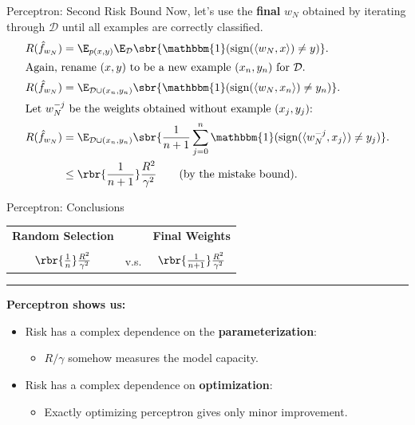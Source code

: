 \documentclass[notheorems]{beamer}
\begin{document}
    \begin{frame}{Perceptron: Second Risk Bound}
        Now, let's use the \textbf{final} $w_{N}$ obtained by iterating through $\mathcal{D}$ until all examples are correctly classified.
        \begin{align*}
        R(\hat f_{w_N}) &= \E_{p(x,y)} \E_\mathcal{D} \sbr{ \mathbbm{1}(\text{sign}(\langle w_N, x\rangle) \neq y)}.\\
        \intertext{Again, rename $(x,y)$ to be a new example $(x_{n}, y_{n})$ for $\mathcal{D}$. }
        R(\hat f_{w_N}) &= \E_{\mathcal{D} \cup (x_{n}, y_{n}) } \sbr{ \mathbbm{1}(\text{sign}(\langle w_N, x_n\rangle) \neq y_n)}.\\
        \intertext{Let $w^{-j}_{N}$ be the weights obtained without example $(x_j, y_j)$:}
        R(\hat f_{w_N}) &= \E_{\mathcal{D} \cup (x_{n}, y_{n}) } \sbr{ \frac{1}{n+1} \sum_{j=0}^{n} \mathbbm{1}(\text{sign}(\langle w^{-j}_N, x_j\rangle) \neq y_j)}.\\
        &\leq \rbr{\frac{1}{n+1}} \frac{R^2}{\gamma^2} \tag{by the mistake bound}.\\
        \end{align*}


    \end{frame}

    \begin{frame}{Perceptron: Conclusions}
        \vspace{-0.5cm}
        \begin{table}
            \centering
        \begin{tabular}{c c c}
            \textbf{Random Selection} & & \textbf{Final Weights}\\
            & & \\
            \huge $\rbr{\frac{1}{n}} \frac{R^2}{\gamma^2}$ & v.s. & \huge $\rbr{\frac{1}{n+1}} \frac{R^2}{\gamma^2}$\vspace{0.4cm}
        \end{tabular}
        \rule{10cm}{0.025cm}
        \end{table}
        \vspace{0.2cm}
        \textbf{Perceptron shows us:}
        \begin{itemize}
            \item Risk has a complex dependence on the \textbf{parameterization}:
                \begin{itemize}
                    \item $R / \gamma$ somehow measures the model capacity.
                \end{itemize}
            \item Risk has a complex dependence on \textbf{optimization}:
                \begin{itemize}
                    \item Exactly optimizing perceptron gives only minor improvement.
                \end{itemize}
        \end{itemize}

    \end{frame}
\end{document}
